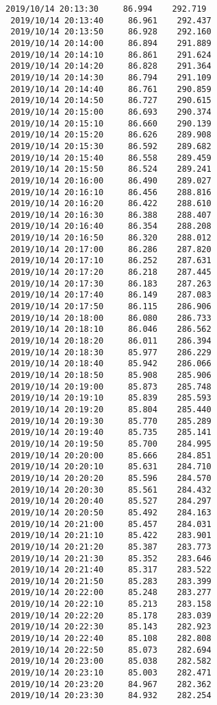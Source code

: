 \documentclass[11pt]{article}
\begin{document}
\begin{Verbatim}[commandchars=\\\{\}]
 2019/10/14 20:13:30     86.994    292.719
 2019/10/14 20:13:40     86.961    292.437
 2019/10/14 20:13:50     86.928    292.160
 2019/10/14 20:14:00     86.894    291.889
 2019/10/14 20:14:10     86.861    291.624
 2019/10/14 20:14:20     86.828    291.364
 2019/10/14 20:14:30     86.794    291.109
 2019/10/14 20:14:40     86.761    290.859
 2019/10/14 20:14:50     86.727    290.615
 2019/10/14 20:15:00     86.693    290.374
 2019/10/14 20:15:10     86.660    290.139
 2019/10/14 20:15:20     86.626    289.908
 2019/10/14 20:15:30     86.592    289.682
 2019/10/14 20:15:40     86.558    289.459
 2019/10/14 20:15:50     86.524    289.241
 2019/10/14 20:16:00     86.490    289.027
 2019/10/14 20:16:10     86.456    288.816
 2019/10/14 20:16:20     86.422    288.610
 2019/10/14 20:16:30     86.388    288.407
 2019/10/14 20:16:40     86.354    288.208
 2019/10/14 20:16:50     86.320    288.012
 2019/10/14 20:17:00     86.286    287.820
 2019/10/14 20:17:10     86.252    287.631
 2019/10/14 20:17:20     86.218    287.445
 2019/10/14 20:17:30     86.183    287.263
 2019/10/14 20:17:40     86.149    287.083
 2019/10/14 20:17:50     86.115    286.906
 2019/10/14 20:18:00     86.080    286.733
 2019/10/14 20:18:10     86.046    286.562
 2019/10/14 20:18:20     86.011    286.394
 2019/10/14 20:18:30     85.977    286.229
 2019/10/14 20:18:40     85.942    286.066
 2019/10/14 20:18:50     85.908    285.906
 2019/10/14 20:19:00     85.873    285.748
 2019/10/14 20:19:10     85.839    285.593
 2019/10/14 20:19:20     85.804    285.440
 2019/10/14 20:19:30     85.770    285.289
 2019/10/14 20:19:40     85.735    285.141
 2019/10/14 20:19:50     85.700    284.995
 2019/10/14 20:20:00     85.666    284.851
 2019/10/14 20:20:10     85.631    284.710
 2019/10/14 20:20:20     85.596    284.570
 2019/10/14 20:20:30     85.561    284.432
 2019/10/14 20:20:40     85.527    284.297
 2019/10/14 20:20:50     85.492    284.163
 2019/10/14 20:21:00     85.457    284.031
 2019/10/14 20:21:10     85.422    283.901
 2019/10/14 20:21:20     85.387    283.773
 2019/10/14 20:21:30     85.352    283.646
 2019/10/14 20:21:40     85.317    283.522
 2019/10/14 20:21:50     85.283    283.399
 2019/10/14 20:22:00     85.248    283.277
 2019/10/14 20:22:10     85.213    283.158
 2019/10/14 20:22:20     85.178    283.039
 2019/10/14 20:22:30     85.143    282.923
 2019/10/14 20:22:40     85.108    282.808
 2019/10/14 20:22:50     85.073    282.694
 2019/10/14 20:23:00     85.038    282.582
 2019/10/14 20:23:10     85.003    282.471
 2019/10/14 20:23:20     84.967    282.362
 2019/10/14 20:23:30     84.932    282.254

\end{Verbatim}
\end{document}
